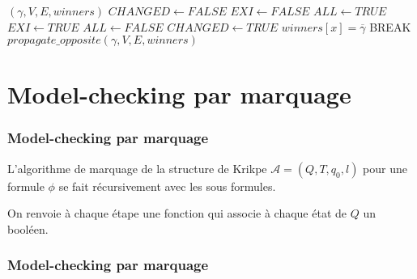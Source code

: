 \documentclass[11pt]{beamer}
\begin{document}
\begin{algorithm}[h!]
\caption{$propagate\_opposite$}

\begin{algorithmic}[1]
    \scriptsize
    \REQUIRE $(\gamma, V, E, winners)$
    \STATE $CHANGED \leftarrow FALSE$
            \STATE $EXI \leftarrow FALSE$
            \STATE $ALL \leftarrow TRUE$
                    \STATE $EXI \leftarrow TRUE$
                \ELSE
                    \STATE $ALL \leftarrow FALSE$
                \ENDIF
            \ENDFOR
                \STATE $CHANGED \leftarrow TRUE$
                \STATE $winners[x] = \overline{\gamma}$
                \STATE BREAK 
            \ENDIF
        \ENDIF
    \ENDFOR
        \STATE $propagate\_opposite(\gamma, V, E, winners)$
    \ENDIF
    \RETURN
\end{algorithmic}
\end{algorithm}



\section{Model-checking par marquage}
\begin{frame}
    \frametitle{Model-checking par marquage}
    L'algorithme de marquage de la structure de Krikpe $\mathcal{A} = (Q, T, q_0, l)$ pour une formule $\phi$ se fait récursivement avec les sous formules.\\\bigskip

    On renvoie à chaque étape une fonction qui associe à chaque état de $Q$ un booléen.
\end{frame}

\begin{frame}
    \frametitle{Model-checking par marquage}
\end{frame}
\end{document}
